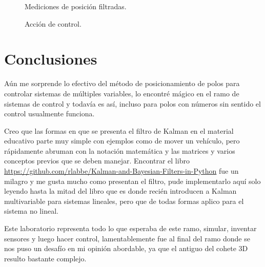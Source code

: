 \documentclass[titlepage, letterpaper]{article}
\begin{document}
\begin{figure}[H]
	\centering
	
	\caption{Mediciones de posición filtradas.}
\end{figure}

\begin{figure}[H]
	\centering
	
	\caption{Acción de control.}
\end{figure}

\section{Conclusiones}

Aún me sorprende lo efectivo del método de posicionamiento de polos para controlar sistemas de múltiples variables, lo encontré mágico en el ramo de sistemas de control y todavía es así, incluso para polos con números sin sentido el control usualmente funciona.

Creo que las formas en que se presenta el filtro de Kalman en el material educativo parte muy simple con ejemplos como de mover un vehículo, pero rápidamente abruman con la notación matemática y las matrices y varios conceptos previos que se deben manejar. Encontrar el libro \url{https://github.com/rlabbe/Kalman-and-Bayesian-Filters-in-Python} fue un milagro y me gusta mucho como presentan el filtro, pude implementarlo aquí solo leyendo hasta la mitad del libro que es donde recién introducen a Kalman multivariable para sistemas lineales, pero que de todas formas aplico para el sistema no lineal.

Este laboratorio representa todo lo que esperaba de este ramo, simular, inventar sensores y luego hacer control, lamentablemente fue al final del ramo donde se nos puso un desafío en mi opinión abordable, ya que el antiguo del cohete 3D resulto bastante complejo.
\end{document}

